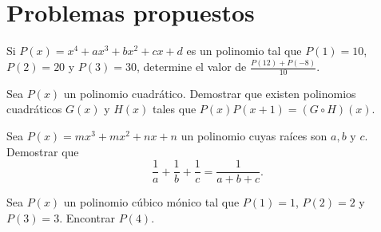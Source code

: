\section{Problemas propuestos}

\begin{section-problem}
    Si $P(x) = x^4 + ax^3 + bx^2 + cx + d$ es un polinomio tal que $P(1) = 10$, $P(2) = 20$ y $P(3) = 30$, determine el valor de $\frac{P(12) + P(-8)}{10}.$
\end{section-problem}

\begin{section-problem}
    Sea $P(x)$ un polinomio cuadrático.
    Demostrar que existen polinomios cuadráticos $G(x)$ y $H(x)$ tales que $P(x)P(x+1) = (G \circ H)(x).$
\end{section-problem}

\begin{section-problem}
    Sea $P(x) = mx^3 + mx^2 + nx + n$ un polinomio cuyas raíces son $a, b \mbox{ y } c$. Demostrar que
    \[\frac{1}{a} + \frac{1}{b} + \frac{1}{c} = \frac{1}{a + b + c}.\]
\end{section-problem}

\begin{section-problem}
    Sea $P(x)$ un polinomio cúbico mónico tal que $P(1) = 1$, $P(2) = 2$ y $P(3) = 3$. Encontrar $P(4).$
\end{section-problem}